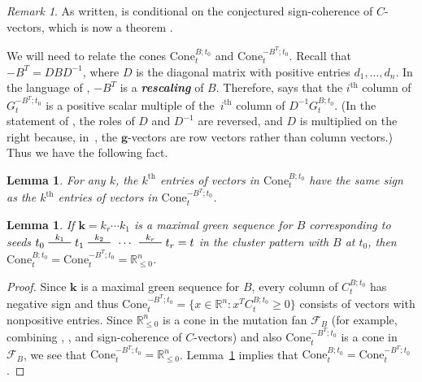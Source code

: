 \documentclass[10pt]{article}
\newtheorem{lemma}[proposition]{Lemma}
\theoremstyle{definition}
\theoremstyle{remark}
\newtheorem{remark}[proposition]{Remark}
\numberwithin{equation}{section}
\newcommand{\newword}[1]{\textbf{\emph{#1}}}
\newcommand{\reals}{\mathbb R}
\newcommand{\edge}{\,\,\rule[2.7pt]{20pt}{0.5pt}\,\,}
\newcommand{\set}[1]{{\lbrace #1 \rbrace}}
\newcommand{\F}{{\mathcal F}}
\renewcommand{\th}{^\text{th}}
\newcommand{\0}{{\mathbf{0}}}
\newcommand{\Cone}{\mathrm{Cone}}
\newcommand{\g}{\mathbf{g}}
\newcommand{\kk}{{\boldsymbol{k}}}
\renewcommand{\th}{^\text{th}}
\newcommand{\symmetrizer}{{D}}
\begin{document}
\begin{remark}\label{conditional}
As written, \cite[Proposition~8.13]{universal} is conditional on the conjectured sign-coherence of $C$-vectors, which is now a theorem \cite[Corollary~5.5]{GHKK}.
\end{remark}

We will need to relate the cones $\Cone^{B;t_0}_t$ and $\Cone^{-B^T;t_0}_t$.
Recall that $-B^T=\symmetrizer B\symmetrizer^{-1}$, where $\symmetrizer$ is the diagonal matrix with positive entries $d_1,\ldots,d_n$.
In the language of \cite[Section~7]{universal}, $-B^T$ is a \newword{rescaling} of $B$.
Therefore, \cite[Proposition~8.20]{universal} says that the $i\th$ column of $G_t^{-B^T;t_0}$ is a positive scalar multiple of the~$i\th$ column of $\symmetrizer^{-1}G_t^{B;t_0}$.
(In the statement of \cite[Proposition~8.20]{universal}, the roles of $\symmetrizer$ and $\symmetrizer^{-1}$ are reversed, and $\symmetrizer$ is multiplied on the right because, in~\cite{universal}, the $\g$-vectors are row vectors rather than column vectors.)
Thus we have the following fact.
\begin{lemma}\label{B or -BT}
For any $k$, the $k\th$ entries of vectors in $\Cone^{B;t_0}_t$ have the same sign as the $k\th$ entries of vectors in $\Cone^{-B^T;t_0}_t$.
\end{lemma}

\begin{lemma}\label{max green neg cone}
If $\kk=k_r\cdots k_1$ is a maximal green sequence for $B$ corresponding to seeds $t_0\overset{k_1}{\edge}t_1\overset{k_2}{\edge}\,\cdots\,\overset{k_r}{\edge}t_r=t$ in the cluster pattern with $B$ at $t_0$, then ${\Cone_t^{B;t_0}=\Cone_t^{-B^T;t_0}=\reals_{\le0}^n}$.
\end{lemma}
\begin{proof}
Since $\kk$ is a maximal green sequence for $B$, every column of $C_t^{B;t_0}$ has negative sign and thus $\Cone_t^{-B^T;t_0}=\set{x\in\reals^n:x^TC_t^{B;t_0}\ge0}$ consists of vectors with nonpositive entries.
Since $\reals_{\le0}^n$ is a cone in the mutation fan $\F_B$ (for example, combining \mbox{\cite[Proposition~7.1]{universal}}, \mbox{\cite[Proposition~8.9]{universal}}, and sign-coherence of $C$-vectors) and also $\Cone_t^{-B^T;t_0}$ is a cone in $\F_B$, we see that $\Cone_t^{-B^T;t_0}=\reals_{\le0}^n$.
Lemma~\ref{B or -BT} implies that $\Cone_t^{B;t_0}=\Cone_t^{-B^T;t_0}$.
\end{proof}
\end{document}
